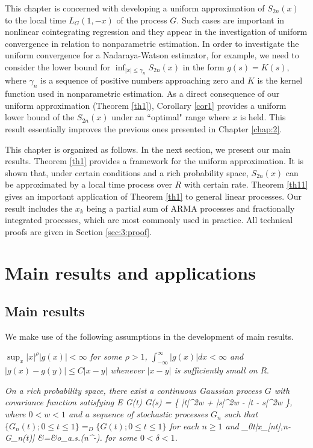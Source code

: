 This chapter is concerned with developing a uniform approximation of $S_{2n}(x)$ to the local time $L_{G}(1,-x)$ of the process $G$. Such cases are important in nonlinear cointegrating regression and they appear in the investigation  of   uniform convergence in relation to  nonparametric estimation.  In order to investigate the uniform convergence for a Nadaraya-Watson estimator, for example, we need to consider the lower bound for $\inf _{|x|\le \gamma_n}S_{2n}(x)$ in
the form $g( s) =K( s),$ where $\gamma_n$ is a sequence of positive numbers approaching zero and $K $ is the kernel function used in nonparametric estimation. As  a direct consequence of our uniform approximation  (Theorem \ref{th1}), Corollary \ref{cor1} provides a uniform lower  bound of the $S_{2n}(x)$ under  an ``optimal" range where $x$ is held. This result essentially improves the previous ones presented in Chapter \ref{chap:2}. 

This chapter is organized as follows.  In the next section, we present our
main results. Theorem \ref {th1} provides a framework for the uniform approximation. It is shown that, under certain conditions and a rich probability space, $S_{2n}(x)$ can be approximated by a local time process over $R$ with certain rate. Theorem \ref {th11} gives an important application of
Theorem \ref {th1} to general linear processes. Our result includes
 the $x_k$ being a partial sum of ARMA processes and fractionally integrated processes, which are most commonly used in practice. All technical proofs are given in Section \ref{sec:3:proof}.



\section{Main results and applications}
\subsection{Main results}

We make use of the following assumptions in the development of main results.

\begin{assump}  \textit{
$\sup_x |x|^{\rho} |g(x)|<\infty$ for some $\rho > 1$, $\int_{-\infty}^{\infty}|g(x)|dx<\infty$ \textit{and }\
$|g(x)-g(y)|\le C|x-y|$ whenever  $|x-y|$ is sufficiently small on }$R$.
\end{assump}


\begin{assump} 
 \textit{On a rich probability space, there exist a continuous Gaussian process $G$ with covariance function satisfying
 \be
E G(t) G(s) =  \{ |t|^{2w} + |s|^{2w} - |t - s|^{2w} \},
\ee
where $0 < w < 1$ and a sequence of stochastic processes $G_n$  such that $\{G_n(t); 0 \le t \le 1\} =_D \{G(t); 0 \le t \le 1\}$ for each $n \ge 1$ and
\be
 \sup_{0\le t}|x_{[nt],n}-G_n(t)| &=&o_{a.s.}(n^{-\delta}).
 \la {a2}
\ee
for some $0<\delta<1$. }
\end{assump}

